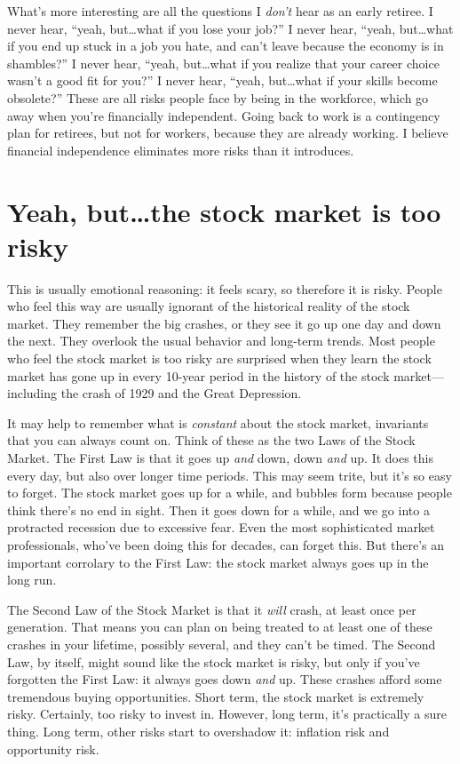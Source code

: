 What's more interesting are all the questions I \emph{don't} hear as an early retiree. I never hear, ``yeah, but\ldots what if you lose your job?'' I never hear, ``yeah, but\ldots what if you end up stuck in a job you hate, and can't leave because the economy is in shambles?'' I never hear, ``yeah, but\ldots what if you realize that your career choice wasn't a good fit for you?'' I never hear, ``yeah, but\ldots what if your skills become obsolete?'' These are all risks people face by being in the workforce, which go away when you're financially independent. Going back to work is a contingency plan for retirees, but not for workers, because they are already working. I believe financial independence eliminates more risks than it introduces.

\section{Yeah, but\ldots the stock market is too risky}
This is usually emotional reasoning: it feels scary, so therefore it is risky. People who feel this way are usually ignorant of the historical reality of the stock market. They remember the big crashes, or they see it go up one day and down the next. They overlook the usual behavior and long-term trends. Most people who feel the stock market is too risky are surprised when they learn the stock market has gone up in every 10-year period in the history of the stock market---including the crash of 1929 and the Great Depression.

It may help to remember what is \emph{constant} about the stock market, invariants that you can always count on. Think of these as the two Laws of the Stock Market. The First Law is that it goes up \emph{and} down, down \emph{and} up. It does this every day, but also over longer time periods. This may seem trite, but it's so easy to forget. The stock market goes up for a while, and bubbles form because people think there's no end in sight. Then it goes down for a while, and we go into a protracted recession due to excessive fear. Even the most sophisticated market professionals, who've been doing this for decades, can forget this. But there's an important corrolary to the First Law: the stock market always goes up in the long run.

The Second Law of the Stock Market is that it \emph{will} crash, at least once per generation. That means you can plan on being treated to at least one of these crashes in your lifetime, possibly several, and they can't be timed. The Second Law, by itself, might sound like the stock market is risky, but only if you've forgotten the First Law: it always goes down \emph{and} up. These crashes afford some tremendous buying opportunities. Short term, the stock market is extremely risky. Certainly, too risky to invest in. However, long term, it's practically a sure thing. Long term, other risks start to overshadow it: inflation risk and opportunity risk.

